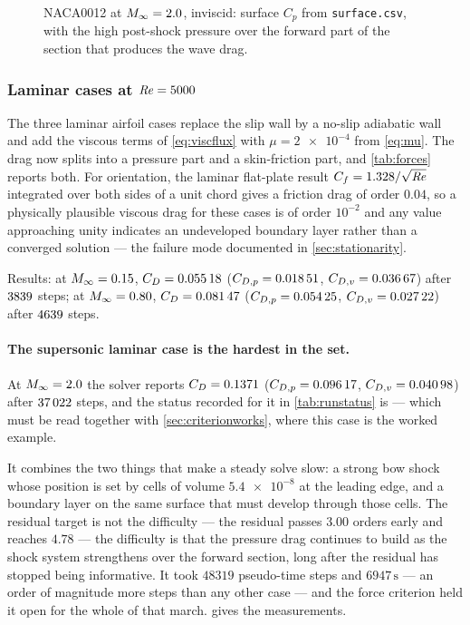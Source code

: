 \begin{figure}[htbp]
  \centering
  \caption{NACA0012 at $M_\infty=2.0$, inviscid: surface $C_p$ from
  \texttt{surface.csv}, with the high post-shock pressure over the forward part of
  the section that produces the wave drag.}
  \label{fig:naca200inv-cp}
\end{figure}

\subsubsection{Laminar cases at $\mathit{Re}=5000$}

The three laminar airfoil cases replace the slip wall by a no-slip adiabatic wall
and add the viscous terms of \cref{eq:viscflux} with $\mu=\num{2e-4}$ from
\cref{eq:mu}. The drag now splits into a pressure part and a skin-friction part,
and \cref{tab:forces} reports both. For orientation, the laminar flat-plate
result $C_f = 1.328/\sqrt{\mathit{Re}}$ integrated over both sides of a unit chord
gives a friction drag of order $0.04$, so a physically plausible viscous drag for
these cases is of order $10^{-2}$ and any value approaching unity indicates an
undeveloped boundary layer rather than a converged solution --- the failure mode
documented in \cref{sec:stationarity}.

Results: at $M_\infty=0.15$, $C_D=\num{0.05518}$
($C_{D,p}=\num{0.01851}$, $C_{D,v}=\num{0.03667}$) after
$\num{3839}$ steps; at $M_\infty=0.80$, $C_D=\num{0.08147}$
($C_{D,p}=\num{0.05425}$, $C_{D,v}=\num{0.02722}$) after
$\num{4639}$ steps.

\paragraph{The supersonic laminar case is the hardest in the set.} At $M_\infty=2.0$ the
solver reports $C_D=\num{0.1371}$ ($C_{D,p}=\num{0.09617}$,
$C_{D,v}=\num{0.04098}$) after $\num{37022}$ steps, and the status recorded
for it in \cref{tab:runstatus} is \cnsStatusNacaSupLam{} --- which must be read together
with \cref{sec:criterionworks}, where this case is the worked example.

It combines the two things that make a steady solve slow: a strong bow shock whose
position is set by cells of volume $\num{5.4e-8}$ at the leading edge, and a boundary
layer on the same surface that must develop through those cells. The residual target is
not the difficulty --- the residual passes $3.00$ orders early and reaches $4.78$ --- the
difficulty is that the pressure drag continues to build as the shock system strengthens
over the forward section, long after the residual has stopped being informative. It took
$\num{48319}$ pseudo-time steps and $6947\,\mathrm{s}$ --- an order of magnitude more
steps than any other case --- and the force criterion held it open for the whole of that
march.  gives the measurements.

